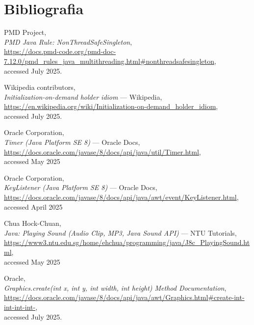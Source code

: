 \documentclass[a4paper,12pt]{report}
\begin{document}
\chapter{Bibliografia}
\begin{thebibliography}{9}

    PMD Project,\\
    \emph{PMD Java Rule: NonThreadSafeSingleton},\\
    \url{https://docs.pmd-code.org/pmd-doc-7.12.0/pmd_rules_java_multithreading.html#nonthreadsafesingleton},\\
    accessed July 2025.
    
    Wikipedia contributors,\\
    \emph{Initialization-on-demand holder idiom} --- Wikipedia,\\
    \url{https://en.wikipedia.org/wiki/Initialization-on-demand_holder_idiom},\\
    accessed July 2025.

    
    Oracle Corporation,\\
    \emph{Timer (Java Platform SE 8)} --- Oracle Docs,\\
    \url{https://docs.oracle.com/javase/8/docs/api/java/util/Timer.html},\\
    accessed May 2025

    Oracle Corporation,\\
    \emph{KeyListener (Java Platform SE 8)} --- Oracle Docs,\\
    \url{https://docs.oracle.com/javase/8/docs/api/java/awt/event/KeyListener.html},\\
    accessed April 2025

    Chua Hock-Chuan,\\
    \emph{Java: Playing Sound (Audio Clip, MP3, Java Sound API)} --- NTU Tutorials,\\
    \url{https://www3.ntu.edu.sg/home/ehchua/programming/java/J8c_PlayingSound.html},\\
    accessed May 2025

    Oracle,\\
    \emph{Graphics.create(int x, int y, int width, int height) Method Documentation},\\
    \url{https://docs.oracle.com/javase/8/docs/api/java/awt/Graphics.html#create-int-int-int-int-},\\
    accessed July 2025.

    \end{thebibliography}
\end{document}
